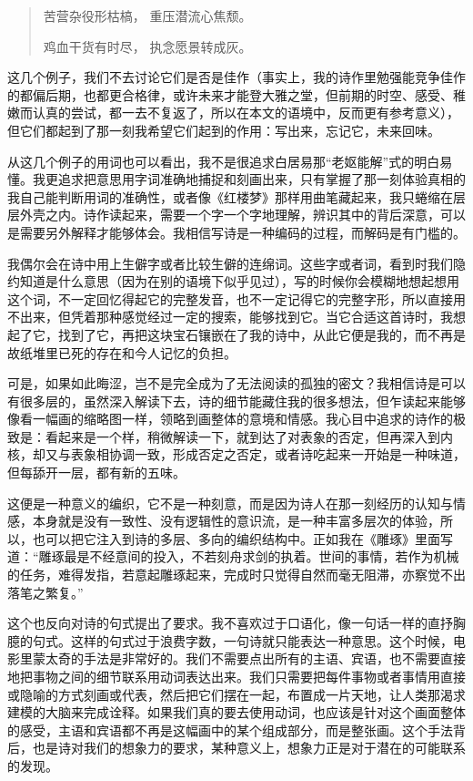 \documentclass{article}
\begin{document}
\begin{quote}
苦营杂役形枯槁， 重压潜流心焦颓。

鸡血干货有时尽， 执念愿景转成灰。
\end{quote}

这几个例子，我们不去讨论它们是否是佳作（事实上，我的诗作里勉强能竞争佳作的都偏后期，也都更合格律，或许未来才能登大雅之堂，但前期的时空、感受、稚嫩而认真的尝试，都一去不复返了，所以在本文的语境中，反而更有参考意义），但它们都起到了那一刻我希望它们起到的作用：写出来，忘记它，未来回味。

从这几个例子的用词也可以看出，我不是很追求白居易那``老妪能解''式的明白易懂。我更追求把意思用字词准确地捕捉和刻画出来，只有掌握了那一刻体验真相的我自己能判断用词的准确性，或者像《红楼梦》那样用曲笔藏起来，我只蜷缩在层层外壳之内。诗作读起来，需要一个字一个字地理解，辨识其中的背后深意，可以是需要另外解释才能够体会。我相信写诗是一种编码的过程，而解码是有门槛的。

我偶尔会在诗中用上生僻字或者比较生僻的连绵词。这些字或者词，看到时我们隐约知道是什么意思（因为在别的语境下似乎见过），写的时候你会模糊地想起想用这个词，不一定回忆得起它的完整发音，也不一定记得它的完整字形，所以直接用不出来，但凭着那种感觉经过一定的搜索，能够找到它。当它合适这首诗时，我想起了它，找到了它，再把这块宝石镶嵌在了我的诗中，从此它便是我的，而不再是故纸堆里已死的存在和今人记忆的负担。

可是，如果如此晦涩，岂不是完全成为了无法阅读的孤独的密文？我相信诗是可以有很多层的，虽然深入解读下去，诗的细节能藏住我的很多想法，但乍读起来能够像看一幅画的缩略图一样，领略到画整体的意境和情感。我心目中追求的诗作的极致是：看起来是一个样，稍微解读一下，就到达了对表象的否定，但再深入到内核，却又与表象相协调一致，形成否定之否定，或者诗吃起来一开始是一种味道，但每舔开一层，都有新的五味。

这便是一种意义的编织，它不是一种刻意，而是因为诗人在那一刻经历的认知与情感，本身就是没有一致性、没有逻辑性的意识流，是一种丰富多层次的体验，所以，也可以把它注入到诗的多层、多向的编织结构中。正如我在《雕琢》里面写道：``雕琢最是不经意间的投入，不若刻舟求剑的执着。世间的事情，若作为机械的任务，难得发指，若意起雕琢起来，完成时只觉得自然而毫无阻滞，亦察觉不出落笔之繁复。''

这个也反向对诗的句式提出了要求。我不喜欢过于口语化，像一句话一样的直抒胸臆的句式。这样的句式过于浪费字数，一句诗就只能表达一种意思。这个时候，电影里蒙太奇的手法是非常好的。我们不需要点出所有的主语、宾语，也不需要直接地把事物之间的细节联系用动词表达出来。我们只需要把每件事物或者事情用直接或隐喻的方式刻画或代表，然后把它们摆在一起，布置成一片天地，让人类那渴求建模的大脑来完成诠释。如果我们真的要去使用动词，也应该是针对这个画面整体的感受，主语和宾语都不再是这幅画中的某个组成部分，而是整张画。这个手法背后，也是诗对我们的想象力的要求，某种意义上，想象力正是对于潜在的可能联系的发现。
\end{document}
